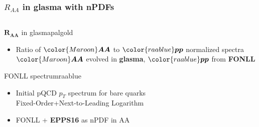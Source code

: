 \documentclass[aspectratio=169,11pt,usenames,dvipsnames]{beamer}
\begin{document}
\begin{frame}
    \frametitle{$R_{AA}$ in glasma with nPDFs}
    \vspace{-20pt}
    \begin{columns}[onlytextwidth,t]
       \begin{center}
        \begin{custombox2}{$\boldsymbol{R_{AA}}$ in glasma}{palgold}
            \small
            \begin{varwidth}{1.05\textwidth}
            \begin{itemize}\itemsep0em 
                \itemsep0em
                \item Ratio of ${\color{Maroon}\boldsymbol{AA}}$ to ${\color{raablue}\boldsymbol{pp}}$ normalized spectra \\
                {\scriptsize\color{lightgray}${\color{Maroon}\boldsymbol{AA}}$ evolved in {\color{Maroon}\bfseries glasma}, ${\color{raablue}\boldsymbol{pp}}$ from {\color{raablue}\bfseries FONLL}}
            \end{itemize}
            \end{varwidth}
        \end{custombox2}
        \begin{custombox2}{{\normalsize FONLL spectrum}}{raablue}
            \small
            \begin{varwidth}{1.05\textwidth}
            \begin{itemize}\itemsep0em 
                \itemsep0em
                \footnotesize
                \item Initial pQCD $p_T$ spectrum for bare quarks\\
                {\scriptsize\color{lightgray}Fixed-Order+Next-to-Leading Logarithm}
                \item FONLL + {\color{palteal}\bfseries EPPS16} as nPDF in AA
            \end{itemize}
            \end{varwidth}
        \end{custombox2}

\end{center}
\end{columns}
\end{frame}
\end{document}
